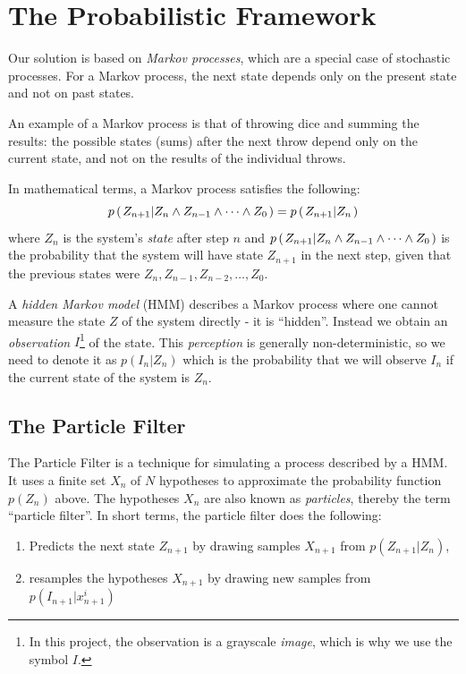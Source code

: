 \section*{The Probabilistic Framework}
Our solution is based on \emph{Markov processes}, which are a special case of stochastic processes. For a Markov process, the next state depends only on the present state and not on past states.

An example of a Markov process is that of throwing dice and summing the results: the possible states (sums) after the next throw depend only on the current state, and not on the results of the individual throws.

In mathematical terms, a Markov process satisfies the following:
\begin{equation}
 p\left(\left. Z_{n+1} \middle\vert Z_n \wedge Z_{n-1} \wedge \dots \wedge Z_0 \right.\right) = p\left(\left. Z_{n+1} \middle\vert Z_n \right.\right)
\end{equation}
where $Z_n$ is the system's \emph{state} after step $n$ and $p\left(\left. Z_{n+1} \middle\vert Z_n \wedge Z_{n-1} \wedge \dots \wedge Z_0 \right.\right)$ is the probability that the system will have state $Z_{n+1}$ in the next step, given that the previous states were $Z_n, Z_{n-1}, Z_{n-2}, \dots, Z_0$.

A \emph{hidden Markov model} (HMM) describes a Markov process where one cannot measure the state $Z$ of the system directly - it is ``hidden''. Instead we obtain an \emph{observation} $I$\footnote{In this project, the observation is a grayscale \emph{image}, which is why we use the symbol $I$.}  of the state. This \emph{perception} is generally non-deterministic, so we need to denote it as $p(I_n|Z_n)$ which is the probability that we will observe $I_n$ if the current state of the system is $Z_n$.

\subsection*{The Particle Filter}
The Particle Filter is a technique for simulating a process described by a HMM. It uses a finite set $X_n$ of $N$ hypotheses to approximate the probability function $p(Z_n)$ above. The hypotheses $X_n$ are also known as \emph{particles}, thereby the term ``particle filter''. In short terms, the particle filter does the following:

\begin{enumerate}
  \item Predicts the next state $Z_{n+1}$ by drawing samples $X_{n+1}$ from $p(Z_{n+1} | Z_n)$,
  \item resamples the hypotheses $X_{n+1}$ by drawing new samples from $p\left(I_{n+1} | x_{n+1}^i\right)$
\end{enumerate}


